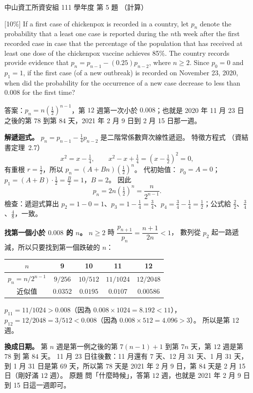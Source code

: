 \begin{pastexam}[label={px:nsysu-111-dmalg-03}]{中山資工所資安組 111 學年度 第 5 題}
（計算）

{[10\%]} If a first case of chickenpox is recorded in a country, let $p_n$ denote the probability
that a least one case is reported during the $n$th week after the first recorded case in case that
the percentage of the population that has received at least one dose of the chickenpox vaccine
achieves 85\%. The country records provide evidence that $p_n=p_{n-1}-(0.25)p_{n-2}$, where
$n\ge 2$. Since $p_0=0$ and $p_1=1$, if the first case (of a new outbreak) is recorded on November 23,
2020, when did the probability for the occurrence of a new case decrease to less than 0.008 for the
first time?
\end{pastexam}

\begin{pastsoln}
答案：$p_n = n \left(\tfrac{1}{2}\right)^{n-1}$，第 $12$ 週第一次小於 $0.008$；也就是 2020 年
11 月 23 日之後的第 $78$ 到第 $84$ 天，2021 年 2 月 9 日到 2 月 15 日那一週。

\textbf{解遞迴式。} $p_n = p_{n-1} - \frac{1}{4} p_{n-2}$ 是二階常係數齊次線性遞迴。 特徵方程式
（資結書定理~2.7）
\[
x^2 = x - \tfrac{1}{4}, \qquad x^2 - x + \tfrac{1}{4} = \left(x - \tfrac{1}{2}\right)^2 = 0 ,
\]
有重根 $r = \frac{1}{2}$，所以 $p_n = (A + Bn)\left(\frac{1}{2}\right)^n$。 代初始值：
$p_0 = A = 0$；$p_1 = (A + B) \cdot \frac{1}{2} = \frac{B}{2} = 1$，$B = 2$。 因此
\[
p_n = 2n \left(\tfrac{1}{2}\right)^n = \frac{n}{2^{n-1}} .
\]
檢查：遞迴式算出 $p_2 = 1 - 0 = 1$、$p_3 = 1 - \frac{1}{4} = \frac{3}{4}$、$p_4 = \frac{3}{4} -
\frac{1}{4} = \frac{1}{2}$；公式給 $\frac{2}{2}$、$\frac{3}{4}$、$\frac{4}{8}$，一致。

\textbf{找第一個小於 $0.008$ 的 $n$。} $n \ge 2$ 時 $\dfrac{p_{n+1}}{p_n} = \dfrac{n+1}{2n} < 1$，
數列從 $p_2$ 起一路遞減，所以只要找到第一個跌破的 $n$：
\begin{center}
\begin{tabular}{c|cccc}
$n$ & 9 & 10 & 11 & 12 \\ \hline
$p_n = n/2^{n-1}$ & $9/256$ & $10/512$ & $11/1024$ & $12/2048$ \\
近似值 & $0.0352$ & $0.0195$ & $0.0107$ & $0.00586$ \\
\end{tabular}
\end{center}
$p_{11} = 11/1024 > 0.008$（因為 $0.008 \times 1024 = 8.192 < 11$），
$p_{12} = 12/2048 = 3/512 < 0.008$（因為 $0.008 \times 512 = 4.096 > 3$）。 所以是第 $12$ 週。

\textbf{換成日期。} 第 $n$ 週是第一例之後的第 $7(n-1)+1$ 到第 $7n$ 天，第 $12$ 週是第 $78$ 到
第 $84$ 天。 11 月 23 日往後數：11 月還有 $7$ 天、12 月 $31$ 天、1 月 $31$ 天，到 1 月 31 日是第
$69$ 天，所以第 $78$ 天是 2021 年 2 月 9 日，第 $84$ 天是 2 月 15 日（剛好滿 $12$ 週）。 原題
問「什麼時候」，答第 $12$ 週，也就是 2021 年 2 月 9 日到 15 日這一週即可。
\end{pastsoln}
